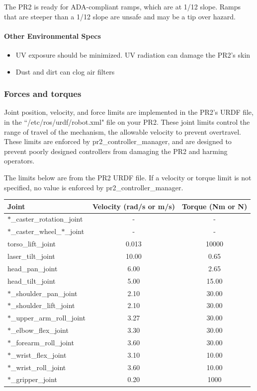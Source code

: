 The PR2 is ready for ADA-compliant ramps, which are at 1/12 slope. Ramps that are steeper than a 1/12 slope are unsafe and may be a tip over hazard.

\paragraph{Other Environmental Specs}

\begin{itemize}
\item UV exposure should be minimized. UV radiation can damage the PR2's skin
\item Dust and dirt can clog air filters
\end{itemize}

\subsubsection{Forces and torques}

Joint position, velocity, and force limits are implemented in the PR2's URDF file, in the ``/etc/ros/urdf/robot.xml" file on your PR2. These joint limits control the range of travel of the mechanism, the allowable velocity to prevent overtravel. These limits are enforced by pr2\_controller\_manager, and are designed to prevent poorly designed controllers from damaging the PR2 and harming operators. 



The limits below are from the PR2 URDF file. If a velocity or torque limit is not specified, no value is enforced by pr2\_controller\_manager.

\begin{tabular}{l*{2}{c}}
Joint  & Velocity (rad/s or m/s) & Torque (Nm or N) \\
\hline \hline
$\ast$\_caster\_rotation\_joint        & -     & -  \\
$\ast$\_caster\_wheel\_$\ast$\_joint   & -     & -  \\
torso\_lift\_joint                     & 0.013 & 10000 \\
laser\_tilt\_joint                     & 10.00 & 0.65  \\
head\_pan\_joint                       & 6.00  & 2.65  \\
head\_tilt\_joint                      & 5.00  & 15.00 \\
$\ast$\_shoulder\_pan\_joint           & 2.10  & 30.00 \\
$\ast$\_shoulder\_lift\_joint          & 2.10  & 30.00 \\
$\ast$\_upper\_arm\_roll\_joint        & 3.27  & 30.00 \\
$\ast$\_elbow\_flex\_joint             & 3.30  & 30.00 \\
$\ast$\_forearm\_roll\_joint           & 3.60  & 30.00 \\
$\ast$\_wrist\_flex\_joint             & 3.10  & 10.00 \\
$\ast$\_wrist\_roll\_joint             & 3.60  & 10.00 \\
$\ast$\_gripper\_joint                 & 0.20  & 1000  \\
\end{tabular}

